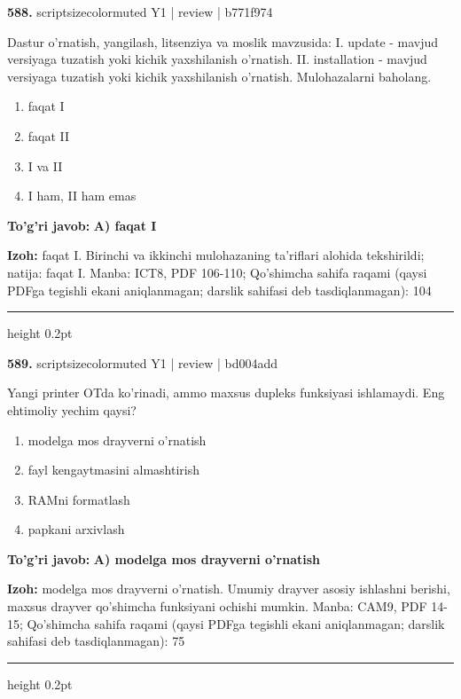 \documentclass[10pt,a4paper]{article}
\begin{document}
{\bfseries\sffamily\color{ink} 588.} {scriptsizecolor{muted} Y1 | review | b771f974}
\par
Dastur o'rnatish, yangilash, litsenziya va moslik mavzusida: I. update - mavjud versiyaga tuzatish yoki kichik yaxshilanish o'rnatish. II. installation - mavjud versiyaga tuzatish yoki kichik yaxshilanish o'rnatish. Mulohazalarni baholang.
\begin{enumerate}[label=\Alph*),leftmargin=9mm]
\item faqat I
\item faqat II
\item I va II
\item I ham, II ham emas
\end{enumerate}
\begin{tcolorbox}[enhanced,breakable,colback=teal!4,colframe=teal!60!black,boxrule=0.45pt,arc=1.2mm,left=2.7mm,right=2.7mm,top=1.8mm,bottom=1.8mm,before skip=2mm,after skip=2mm]
{\bfseries\sffamily\color{teal}To'g'ri javob:} \textbf{A) faqat I}
\par\smallskip
{\bfseries Izoh:} faqat I. Birinchi va ikkinchi mulohazaning ta'riflari alohida tekshirildi; natija: faqat I. Manba: ICT8, PDF 106-110; Qo'shimcha sahifa raqami (qaysi PDFga tegishli ekani aniqlanmagan; darslik sahifasi deb tasdiqlanmagan): 104
\end{tcolorbox}
\vspace{2mm}\hrule height 0.2pt\vspace{3mm}

{\bfseries\sffamily\color{ink} 589.} {scriptsizecolor{muted} Y1 | review | bd004add}
\par
Yangi printer OTda ko'rinadi, ammo maxsus dupleks funksiyasi ishlamaydi. Eng ehtimoliy yechim qaysi?
\begin{enumerate}[label=\Alph*),leftmargin=9mm]
\item modelga mos drayverni o'rnatish
\item fayl kengaytmasini almashtirish
\item RAMni formatlash
\item papkani arxivlash
\end{enumerate}
\begin{tcolorbox}[enhanced,breakable,colback=teal!4,colframe=teal!60!black,boxrule=0.45pt,arc=1.2mm,left=2.7mm,right=2.7mm,top=1.8mm,bottom=1.8mm,before skip=2mm,after skip=2mm]
{\bfseries\sffamily\color{teal}To'g'ri javob:} \textbf{A) modelga mos drayverni o'rnatish}
\par\smallskip
{\bfseries Izoh:} modelga mos drayverni o'rnatish. Umumiy drayver asosiy ishlashni berishi, maxsus drayver qo'shimcha funksiyani ochishi mumkin. Manba: CAM9, PDF 14-15; Qo'shimcha sahifa raqami (qaysi PDFga tegishli ekani aniqlanmagan; darslik sahifasi deb tasdiqlanmagan): 75
\end{tcolorbox}
\vspace{2mm}\hrule height 0.2pt\vspace{3mm}
\end{document}
